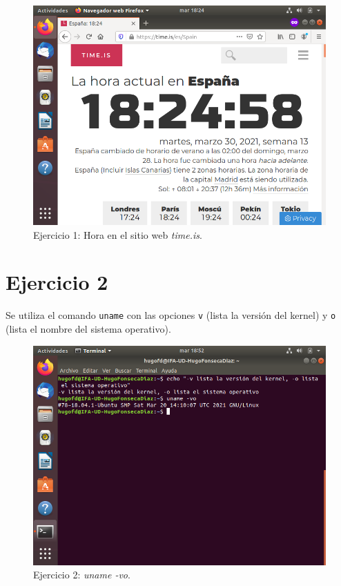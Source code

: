 \documentclass[11pt]{article}
\begin{document}
\begin{figure}[H]
    \caption{Ejercicio 1: Hora en el sitio web \textit{time.is}.}
  \centering
  \includegraphics[scale=0.7]{e1-2.png}
\end{figure}

\section{Ejercicio 2}
Se utiliza el comando \verb|uname| con las opciones \verb|v| (lista la versión del kernel) y \verb|o| (lista el nombre del sistema operativo).

\begin{figure}[H]
    \caption{Ejercicio 2: \textit{uname -vo}.}
  \centering
  \includegraphics[scale=0.7]{e2.png}
\end{figure}
\end{document}
